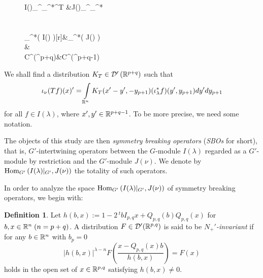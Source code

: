 \documentclass[reqno,12pt]{pja00} %
\newcommand{\tmtextit}[1]{{\itshape{#1}}}
\newcommand{\Hom}{\mbox{\normalfont Hom}}
\newtheorem{fact}{Fact}[section]
\theoremstyle{definition}
\newtheorem{definition}{Definition}
\theoremstyle{exampstyle} \newtheorem{examp}[theorem]{Theorem}
\renewcommand{\Q}{Q_{p,q}}
\newcommand{\IlambdaGprime}{I(\lambda)\kern-0.3em\mid_{G'}}
\newcommand{\SBO}{\Hom_{G'}\left(\IlambdaGprime,J(\nu) \right)}
\begin{document}
\begin{figure}[h]
\centering
\hspace{1.2cm}
	\xymatrix@R=1mm
	{
		I(\lambda)\ar[ddd]_{}^{\iota_\lambda^{*}}\ar[r]^T &J(\nu)\ar[ddd]_{}^{\iota_\nu^{*}}\\
		\\\\
		\iota_\lambda^*\left( I(\lambda) \right)\ar@{-->}[r]&\iota_\nu^{*}\left( J(\nu) \right)\vspace*{-1cm}\\
		\vspace*{-1cm}\bigcap&\bigcap\\
		C^\infty(\R^{p+q})&C^\infty(\R^{p+q-1})
	}
\end{figure}

We shall find a distribution $K_T\in\mathcal{D}'\left( \mathbb{R}^{p+q} \right)$ such that
\begin{equation*}
	\iota_\nu(Tf)(x)'=\int_{\R^n}K_T(x'-y',-y_{p+1})(\iota_\lambda^*f)(y',y_{p+1})dy'dy_{p+1}
\end{equation*}
for all $f\in I(\lambda)$, where $x',y'\in\mathbb{R}^{p+q-1}$. To be more precise, we need some notation.

The objects of this study are then \textit{symmetry breaking operators} (\textit{SBOs} for short),
that is, $G'$-intertwining operators between the $G$-module $I(\lambda)$ regarded as a $G'$-module by restriction and the $G'$-module $J(\nu)$. We denote by $\SBO$ the totality
of such operators.


In order to analyze the space $\SBO$ of symmetry breaking operators, we begin with:
\begin{definition} \label{def1}
	Let $h(b,x):=1-2\,^t\!bI_{p,q}x+\Q(b)\Q(x)$ for $b,x\in\mathbb{R}^{n}\;(n=p+q)$. A distribution
	$F \in \mathcal{D}' (\mathbb{R}^{p,q})$ is said to be
  \tmtextit{$N_+'$-invariant} if 
  for any $b\in\mathbb{R}^n$ with $b_p=0$
  \begin{equation*}
    \label{eq-Nequiv} | h(b,x) |^{\lambda - n} F \left(
    \frac{x - \Q (x) b}{h(b,x)} \right) = F (x)
  \end{equation*}
  holds in the open set of $x\in\mathbb{R}^{p,q}$ satisfying $h(b,x)\neq0$.
  
\end{definition}
\end{document}
